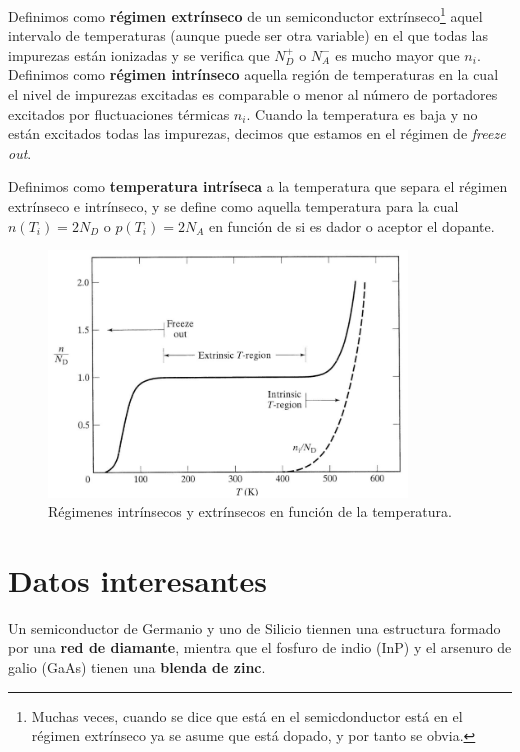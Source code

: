 Definimos como \textbf{régimen extrínseco} de un semiconductor extrínseco\footnote{Muchas veces, cuando se dice que está en el semicdonductor está en el régimen extrínseco ya se asume que está dopado, y por tanto se obvia.} aquel intervalo de temperaturas (aunque puede ser otra variable) en el que todas las impurezas están ionizadas y se verifica que $N_D^+$ o $N_A^-$ es mucho mayor que $n_i$. Definimos como \textbf{régimen intrínseco} aquella región de temperaturas en la cual el nivel de impurezas excitadas es comparable o menor al número de portadores excitados por fluctuaciones térmicas $n_i$. Cuando la temperatura es baja y no están excitados todas las impurezas, decimos que estamos en el régimen de \textit{freeze out}.

Definimos como \textbf{temperatura intríseca} a la temperatura que separa el régimen extrínseco e intrínseco, y se define como aquella temperatura para la cual $n(T_i)=2N_D$ o $p(T_i)=2N_A$ en función de si es dador o aceptor el dopante.


\begin{figure}[h!] \centering
	\includegraphics[width=0.85\textwidth]{Cuerpo/Ch_01/01_06.png}
	\caption{Régimenes intrínsecos y extrínsecos en función de la temperatura.}
\end{figure}



\section{Datos interesantes}

Un semiconductor de Germanio y uno de Silicio tiennen una estructura formado por una \textbf{red de diamante}, mientra que el fosfuro de indio (InP) y el arsenuro de galio (GaAs) tienen una \textbf{blenda de zinc}.







